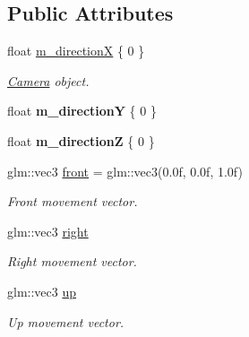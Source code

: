 \subsection*{Public Attributes}
\begin{DoxyCompactItemize}
\item 
float \mbox{\hyperlink{class_camera_component_a7a95ace18cee6a6b88ac5873233e2cc3}{m\+\_\+directionX}} \{ 0 \}
\begin{DoxyCompactList}\small\item\em \mbox{\hyperlink{class_camera}{Camera}} object. \end{DoxyCompactList}\item 
\mbox{\label{class_camera_component_a89b5e6d77f8def9bdcdda71be27cd83f}} 
float {\bfseries m\+\_\+directionY} \{ 0 \}
\item 
\mbox{\label{class_camera_component_abfe4cac0ee5fc5768bdedada791b925e}} 
float {\bfseries m\+\_\+directionZ} \{ 0 \}
\item 
\mbox{\label{class_camera_component_a3cc09f3e499de24e429ad2ad30b6ff43}} 
glm\+::vec3 \mbox{\hyperlink{class_camera_component_a3cc09f3e499de24e429ad2ad30b6ff43}{front}} = glm\+::vec3(0.\+0f, 0.\+0f, 1.\+0f)
\begin{DoxyCompactList}\small\item\em Front movement vector. \end{DoxyCompactList}\item 
\mbox{\label{class_camera_component_a62040ca115beaa48627fe56d330647c0}} 
glm\+::vec3 \mbox{\hyperlink{class_camera_component_a62040ca115beaa48627fe56d330647c0}{right}}
\begin{DoxyCompactList}\small\item\em Right movement vector. \end{DoxyCompactList}\item 
\mbox{\label{class_camera_component_a639f14e0057198d84ed8de71c3df3303}} 
glm\+::vec3 \mbox{\hyperlink{class_camera_component_a639f14e0057198d84ed8de71c3df3303}{up}}
\begin{DoxyCompactList}\small\item\em Up movement vector. \end{DoxyCompactList}\item 

\end{DoxyCompactItemize}

